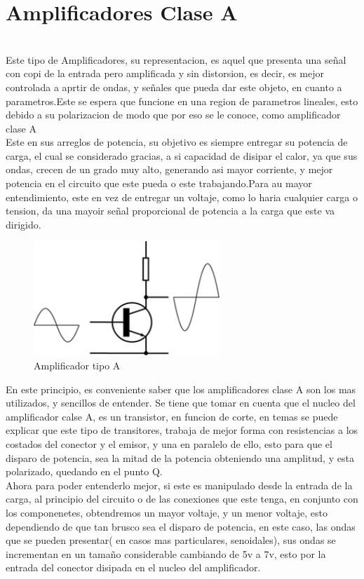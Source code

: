 \documentclass[12pt,a4paper]{article}
\begin{document}
\section{Amplificadores Clase A}\\

Este tipo de Amplificadores, su representacion, es aquel que presenta una señal con copi de la entrada pero amplificada y sin distorsion, es decir, es mejor controlada a aprtir de ondas, y señales que pueda dar este objeto, en cuanto a parametros.Este se espera que funcione en una region de parametros lineales, esto debido a su polarizacion de modo que por eso se le conoce, como amplificador clase A\\
Este en sus arreglos de potencia, su objetivo es siempre entregar su potencia de carga, el cual se considerado gracias, a si capacidad de disipar el calor, ya que sus ondas, crecen de un grado muy alto, generando asi mayor corriente, y mejor potencia en el circuito que este pueda o este trabajando.Para au mayor entendimiento, este en vez de entregar un voltaje, como lo haria cualquier carga o tension, da una mayoir señal proporcional de potencia a la carga que este va dirigido.\\

\begin{figure}[hbtp]
\caption{Amplificador tipo A}
\centering
\includegraphics[width=7cm]{1.png}
\end{figure}

En este principio, es conveniente saber que los amplificadores clase A son los mas utilizados, y sencillos de entender. Se tiene que tomar en cuenta que el nucleo del amplificador calse A, es un transistor, en funcion de corte, en temas se puede explicar que este tipo de transitores, trabaja de mejor forma con resistencias a los costados del conector y el emisor, y una en paralelo de ello, esto para que el disparo de potencia, sea la mitad de la potencia obteniendo una amplitud, y esta polarizado, quedando en el punto Q.\\

Ahora para poder entenderlo mejor, si este es manipulado desde la entrada de la carga, al principio del circuito o de las conexiones que este tenga, en conjunto con los componenetes, obtendremos un mayor voltaje, y un menor voltaje, esto dependiendo de que tan brusco sea el disparo de potencia, en este caso, las ondas que se pueden presentar( en casos mas particulares, senoidales), sus ondas se incrementan en un tamaño considerable cambiando de 5v a 7v, esto por la entrada del conector disipada en el nucleo del amplificador.\\
\end{document}
